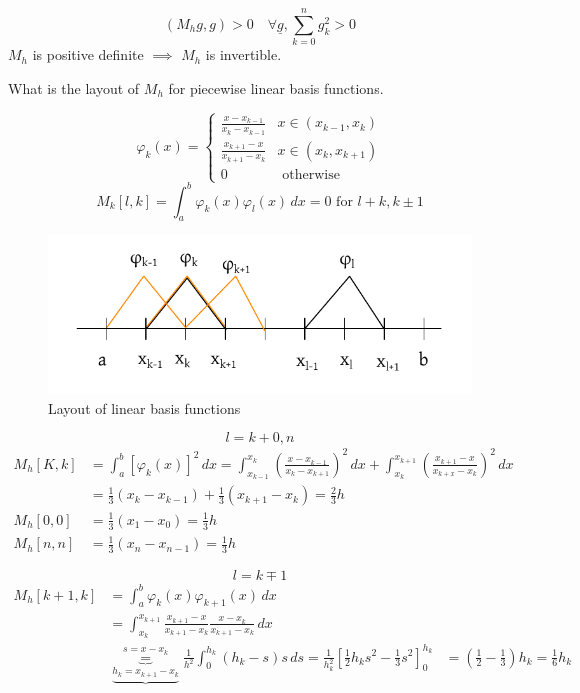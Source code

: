 \documentclass{article}
\begin{document}
\[ (M_h g, g) > 0 \quad \forall \underline{g}, \sum_{k=0}^n g_k^2 > 0 \]
$M_h$ is positive definite $\implies$ $M_h$ is invertible.

What is the layout of $M_h$ for piecewise linear basis functions.

\[
    \varphi_k(x) = \begin{cases}
      \frac{x - x_{k-1}}{x_k - x_{k-1}} & x \in (x_{k-1}, x_k) \\
      \frac{x_{k+1} - x}{x_{k+1} - x_k} & x \in (x_k, x_{k+1}) \\
      0 & \text{ otherwise}
    \end{cases}
\]
\[ M_k[l,k] = \int_a^b \varphi_k(x) \varphi_l(x) \, dx = 0 \text{ for } l+k, k \pm 1 \]

\begin{figure}[h]
  \begin{center}
    \includegraphics{img/04_layout_of_linear_basisfunctions.pdf}
    \caption{Layout of linear basis functions}
  \end{center}
\end{figure}

\[ l = k + 0, n \]
\begin{align*}
  M_h[K,k] &= \int_a^b[\varphi_k(x)]^2 \, dx = \int_{x_{k-1}}^{x_k} \left(\frac{x - x_{k-1}}{x_k - x_{k+1}}\right)^2 \, dx + \int_{x_k}^{x_{k+1}} \left(\frac{x_{k+1} - x}{x_{k+x} - x_k}\right)^2 \, dx \\
    &= \frac13 (x_k - x_{k-1}) + \frac13 (x_{k+1} - x_k) = \frac23 h \\
  M_h[0,0] &= \frac13(x_1 - x_0) = \frac13h \\
  M_h[n,n] &= \frac13(x_n - x_{n-1}) = \frac13 h
\end{align*}

\[ l = k \mp 1 \]
\begin{align*}
  M_h[k+1,k] &= \int_a^b \varphi_k(x) \varphi_{k+1}(x) \, dx \\
    &= \int_{x_k}^{x_{k+1}} \frac{x_{k+1} - x}{x_{k+1} - x_k} \frac{x - x_k}{x_{k+1} - x_k} \, dx \\
    &\underbrace{\underbrace{=}_{h_k = x_{k+1} - x_k}}^{s = x - x_k} \frac{1}{h^2} \int_0^{h_k} (h_k - s) s \, ds = \frac{1}{h_k^2} \left[\frac12 h_k s^2 - \frac13 s^2\right]^{h_k}_0
    &= (\frac12 - \frac13) h_k = \frac16 h_k
\end{align*}
\end{document}
